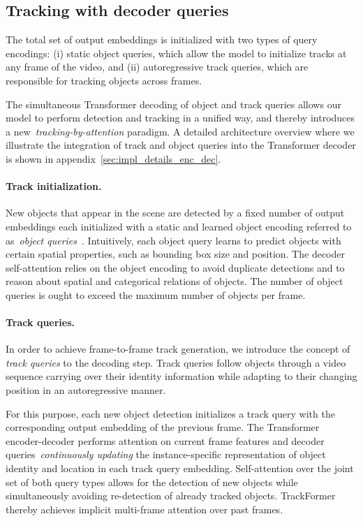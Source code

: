 \documentclass[10pt,twocolumn,letterpaper]{article}
\begin{document}
\subsection{Tracking with decoder queries} \label{sec:mot_with_trackformer}

The total set of output embeddings is initialized with two types of query encodings: (i) static object queries, which allow the model to initialize tracks at any frame of the video, and (ii) autoregressive track queries, which are responsible for tracking objects across frames.


The simultaneous Transformer decoding of object and track queries allows our model to perform detection and tracking in a unified way, and thereby introduces a new~\textit{tracking-by-attention} paradigm.
A detailed architecture overview where we illustrate the integration of track and object queries into the Transformer decoder is shown in appendix~\ref{sec:impl_details_enc_dec}.

\paragraph{Track initialization.}
New objects that appear in the scene are detected by a fixed number of  output embeddings each initialized with a static and learned object encoding referred to as~\textit{object queries}~\cite{DETR}.
Intuitively, each object query learns to predict objects with certain spatial properties, such as bounding box size and position.
The decoder self-attention relies on the object encoding to avoid duplicate detections and to reason about spatial and categorical relations of objects.
The number of object queries is ought to exceed the maximum number of objects per frame.

\paragraph{Track queries.}
In order to achieve frame-to-frame track generation, we introduce the concept of \textit{track queries} to the decoding step.
Track queries follow objects through a video sequence carrying over their identity information while adapting to their changing position in an autoregressive manner.


For this purpose, each new object detection initializes a track query with the corresponding output embedding of the previous frame.
The Transformer encoder-decoder performs attention on current frame features and decoder queries~\textit{continuously updating} the instance-specific representation of object identity and location in each track query embedding.
Self-attention over the joint set of both query types allows for the detection of new objects while simultaneously avoiding re-detection of already tracked objects.
TrackFormer thereby achieves implicit multi-frame attention over past frames.
\end{document}

